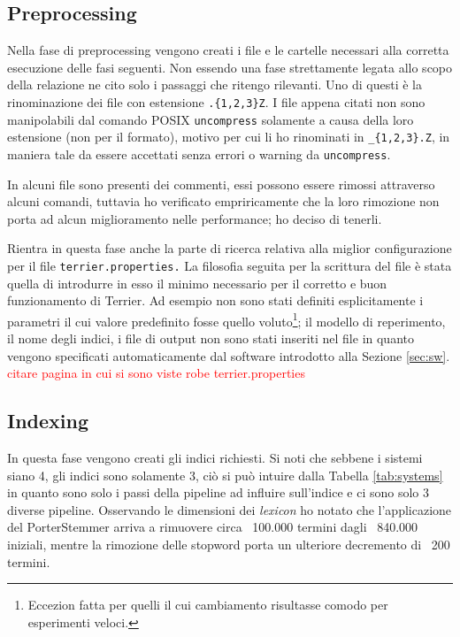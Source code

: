 \documentclass[letterpaper, 10 pt, conference]{ieeeconf}  %
\newcommand\todo[1]{\textcolor{red}{#1}}
\begin{document}
\subsection{Preprocessing}
Nella fase di preprocessing vengono creati i file e le cartelle necessari alla corretta esecuzione delle fasi seguenti. Non essendo una fase strettamente legata allo scopo della relazione ne cito solo i passaggi che ritengo rilevanti. Uno di questi è la rinominazione dei file con estensione \texttt{.\{1,2,3\}Z}. I file appena citati non sono manipolabili dal comando POSIX \texttt{uncompress} solamente a causa della loro estensione (non per il formato), motivo per cui li ho rinominati in \texttt{\_\{1,2,3\}.Z}, in maniera tale da essere accettati senza errori o warning da \texttt{uncompress}.

In alcuni file sono presenti dei commenti, essi possono essere rimossi attraverso alcuni comandi, tuttavia ho verificato empriricamente che la loro rimozione non porta ad alcun miglioramento nelle performance; ho deciso di tenerli.

Rientra in questa fase anche la parte di ricerca relativa alla miglior configurazione per il file \texttt{terrier.properties.} La filosofia seguita per la scrittura del file è stata quella di introdurre in esso il minimo necessario per il corretto e buon funzionamento di Terrier. Ad esempio non sono stati definiti esplicitamente i parametri il cui valore predefinito fosse quello voluto\footnote{Eccezion fatta per quelli il cui cambiamento risultasse comodo per esperimenti veloci.}; il modello di reperimento, il nome degli indici, i file di output non sono stati inseriti nel file in quanto vengono specificati automaticamente dal software introdotto alla Sezione \ref{sec:sw}. \todo{citare pagina in cui si sono viste robe terrier.properties}

\subsection{Indexing}\label{subsec:index}
In questa fase vengono creati gli indici richiesti. Si noti che sebbene i sistemi siano 4, gli indici sono solamente 3, ciò si può intuire dalla Tabella \ref{tab:systems} in quanto sono solo i passi della pipeline ad influire sull'indice e ci sono solo 3 diverse pipeline. Osservando le dimensioni dei \textit{lexicon} ho notato che l'applicazione del PorterStemmer arriva a rimuovere circa ~100.000 termini dagli ~840.000 iniziali, mentre la rimozione delle stopword porta un ulteriore decremento di ~200 termini.
\end{document}
